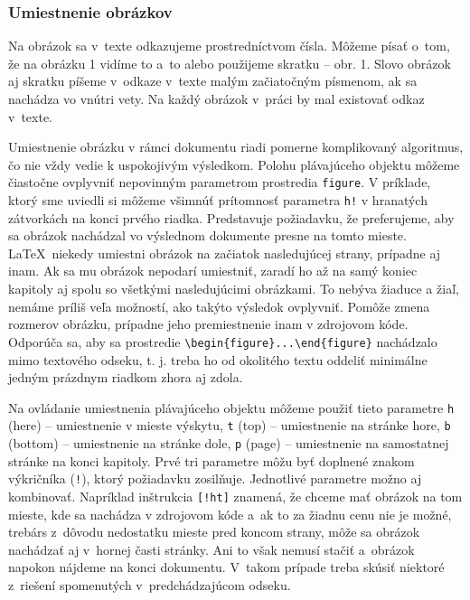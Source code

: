 \subsubsection{Umiestnenie obrázkov}\label{sec:figPlacement}
Na obrázok sa v~texte odkazujeme prostredníctvom čísla.
Môžeme písať o~tom, že na obrázku 1 vidíme to a~to
alebo použijeme skratku -- obr. 1.
Slovo obrázok aj skratku píšeme v~odkaze v~texte
malým začiatočným písmenom, ak sa nachádza vo vnútri vety.
Na každý obrázok v~práci by mal existovať odkaz v~texte.

Umiestnenie obrázku v rámci dokumentu riadi pomerne
komplikovaný algoritmus, čo nie vždy vedie k uspokojivým výsledkom.
Polohu plávajúceho objektu môžeme čiastočne ovplyvniť
nepovinným parametrom prostredia \verb|figure|.
V príklade, ktorý sme uviedli si môžeme všimnúť prítomnosť parametra \verb|h!| v hranatých zátvorkách
na konci prvého riadka.
Predstavuje požiadavku, že preferujeme,  aby sa obrázok nachádzal vo výslednom dokumente presne na tomto mieste. \LaTeX\ niekedy umiestni obrázok na začiatok nasledujúcej strany, prípadne aj inam.
Ak sa mu obrázok nepodarí umiestniť, zaradí ho až na
samý koniec kapitoly aj spolu so všetkými nasledujúcimi obrázkami.
To nebýva žiaduce a žiaľ, nemáme príliš veľa možností, ako takýto výsledok ovplyvniť.
Pomôže zmena rozmerov obrázku, prípadne jeho premiestnenie inam v zdrojovom kóde.
Odporúča sa, aby sa prostredie \verb|\begin{figure}...\end{figure}| nachádzalo mimo textového odseku, t. j. treba ho od okolitého textu oddeliť minimálne jedným prázdnym riadkom zhora aj zdola.

Na ovládanie umiestnenia plávajúceho objektu môžeme použiť tieto 
parametre \verb|h| (here) -- umiestnenie v mieste výskytu, 
\verb|t| (top) -- umiestnenie na stránke hore, \verb|b| (bottom) -- 
umiestnenie na stránke dole, \verb|p| (page) -- umiestnenie 
na samostatnej stránke na konci kapitoly. Prvé tri 
parametre môžu byť doplnené znakom výkričníka (\verb|!|),
ktorý požiadavku zosilňuje. 
Jednotlivé parametre možno aj kombinovať.
Napríklad inštrukcia \verb|[!ht]| znamená, že chceme mať
obrázok na tom mieste, kde sa nachádza v zdrojovom kóde
a~ak to za žiadnu cenu nie je možné,
trebárs z~dôvodu nedostatku mieste pred koncom strany,
môže sa obrázok nachádzať aj v~hornej časti stránky.
Ani to však nemusí stačiť a~obrázok napokon nájdeme
na konci dokumentu.
V~takom prípade treba skúsiť niektoré
z~riešení spomenutých v~predchádzajúcom odseku.

